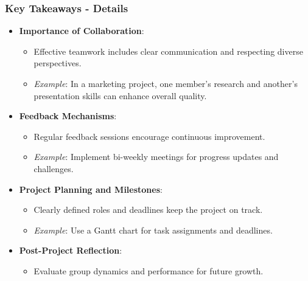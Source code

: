 \documentclass[aspectratio=169]{beamer}
\begin{document}
\begin{frame}[fragile]
    \frametitle{Key Takeaways - Details}
    
    \begin{itemize}
        \item \textbf{Importance of Collaboration}:
        \begin{itemize}
            \item Effective teamwork includes clear communication and respecting diverse perspectives.
            \item \textit{Example}: In a marketing project, one member’s research and another’s presentation skills can enhance overall quality.
        \end{itemize}
        
        \item \textbf{Feedback Mechanisms}:
        \begin{itemize}
            \item Regular feedback sessions encourage continuous improvement.
            \item \textit{Example}: Implement bi-weekly meetings for progress updates and challenges.
        \end{itemize}
        
        \item \textbf{Project Planning and Milestones}:
        \begin{itemize}
            \item Clearly defined roles and deadlines keep the project on track.
            \item \textit{Example}: Use a Gantt chart for task assignments and deadlines.
        \end{itemize}
        
        \item \textbf{Post-Project Reflection}:
        \begin{itemize}
            \item Evaluate group dynamics and performance for future growth.
        \end{itemize}
    \end{itemize}
\end{frame}
\end{document}
